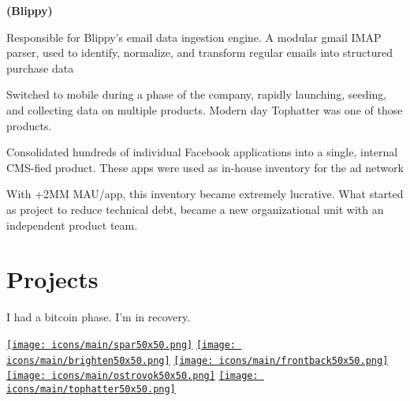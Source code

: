 \documentclass[]{plushcv}
\begin{document}
\begin{minipage}[t]{0.70\textwidth}
\begin{tightemize}
\end{tightemize}
\sectionsep

 \textbf{(Blippy)}
\begin{tightemize}
\item Responsible for Blippy’s email data ingestion engine. A modular gmail IMAP parser, used to identify, normalize, and transform regular emails into structured purchase data
\item Switched to mobile during a phase of the company, rapidly launching, seeding, and collecting data on multiple products. Modern day Tophatter was one of those products. 
\end{tightemize}
\sectionsep

\begin{tightemize}
\item Consolidated hundreds of individual Facebook applications into a single, internal CMS-fied  product. These apps were used as in-house inventory for the ad network  
\item With +2MM MAU/app, this inventory became extremely lucrative.  What started as project to reduce technical debt, became a new organizational unit with an independent product team.
\end{tightemize}
\sectionsep





\section{Projects}

\begin{tightemize}
\item I had a bitcoin phase. I'm in recovery. 
\end{tightemize}
\sectionsep

\sectionsep
\sectionsep
\sectionsep
\sectionsep
\href{https://getspar.com}{\texttt{[image: icons/main/spar50x50.png]}}\hspace{0.3cm}
\href{https://www.nytimes.com/2016/12/20/fashion/austin-kevitch-brighten-app-anti-bullying.html}{\texttt{[image: icons/main/brighten50x50.png]}}\hspace{0.3cm}
\href{https://www.businessinsider.com/frontback-the-once-hot-startup-that-rejected-a-40-million-twitter-acquisition-is-back-from-the-dead-2015-7}{\texttt{[image: icons/main/frontback50x50.png]}}\hspace{0.3cm}
\href{https://apps.apple.com/us/app/ostrovok-ru-hotel-deals/id564204730}{\texttt{[image: icons/main/ostrovok50x50.png]}}\hspace{0.3cm}
\href{https://tophatter.com}{\texttt{[image: icons/main/tophatter50x50.png]}}



\end{minipage}
\end{document}
